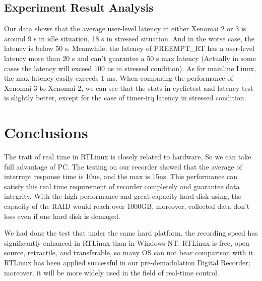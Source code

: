 \documentclass[10pt,a4paper]{article}
\begin{document}
\begin{multicols}{2}
\subsection{Experiment Result Analysis}
Our data shows that the average user-level latency in either Xenomai 2 or 3 is around 9 \textmu s in idle situation, 18 \textmu s in stressed situation. And in the worse case, the latency is below 50 \textmu s. Meanwhile, the latency of PREEMPT\_RT has a user-level latency more than 20 \textmu s and can't guarantee a 50 \textmu s max latency (Actually in some cases the latency will exceed 100 us in stressed condition).  As for mainline Linux, the max latency easily exceeds 1 ms. When comparing the performance of Xenomai-3 to Xenomai-2, we can see that the stats in cyclictest and latency test is slightly better, except for the case of timer-irq latency in stressed condition.

\section{Conclusions}
The trait of real time in RTLinux is closely related to hardware, So we can take full advantage of PC. The testing on our recorder showed that the average of interrupt response time is 10us, and the max  is 15us. This performance can satisfy this real time requirement of recorder completely and guarantee data integrity. With the high-performance and  great capacity hard disk using, the capacity of the RAID would reach over 1000GB, moreover, collected data don't loss even if one hard disk is demaged.

We had done the test that  under the same hard platform, the recording speed has significantly enhanced in RTLinux than in Windows NT. RTLinux is free, open source, retractile, and transferable, so many OS can not bear comparison with it. RTLinux has been applied successful in our pre-demodulation Digital Recorder; moreover, it will be more widely used in the field of real-time control.


\end{multicols}
\end{document}
